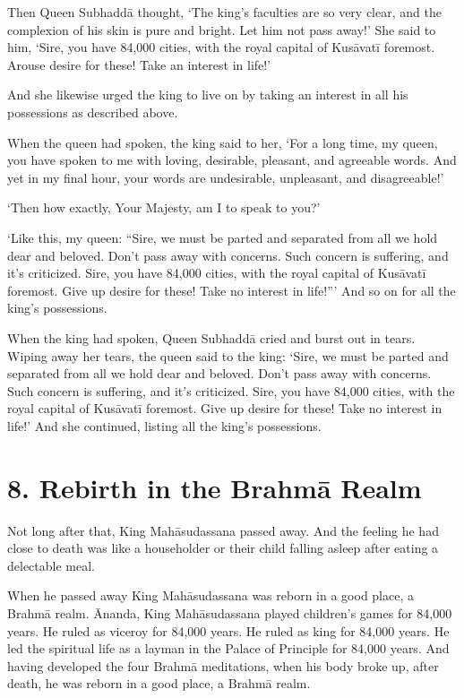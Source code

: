 \documentclass[12pt,openany]{book}%
\begin{document}
Then Queen \textsanskrit{Subhaddā} thought, ‘The king’s faculties are so very clear, and the complexion of his skin is pure and bright. Let him not pass away!’ She said to him, ‘Sire, you have 84,000 cities, with the royal capital of \textsanskrit{Kusāvatī} foremost. Arouse desire for these! Take an interest in life!’ 

And she likewise urged the king to live on by taking an interest in all his possessions as described above. 

When the queen had spoken, the king said to her, ‘For a long time, my queen, you have spoken to me with loving, desirable, pleasant, and agreeable words. And yet in my final hour, your words are undesirable, unpleasant, and disagreeable!’ 

‘Then how exactly, Your Majesty, am I to speak to you?’ 

‘Like this, my queen: “Sire, we must be parted and separated from all we hold dear and beloved. Don’t pass away with concerns. Such concern is suffering, and it’s criticized. Sire, you have 84,000 cities, with the royal capital of \textsanskrit{Kusāvatī} foremost. Give up desire for these! Take no interest in life!”’ And so on for all the king’s possessions. 

When the king had spoken, Queen \textsanskrit{Subhaddā} cried and burst out in tears. Wiping away her tears, the queen said to the king: ‘Sire, we must be parted and separated from all we hold dear and beloved. Don’t pass away with concerns. Such concern is suffering, and it’s criticized. Sire, you have 84,000 cities, with the royal capital of \textsanskrit{Kusāvatī} foremost. Give up desire for these! Take no interest in life!’ And she continued, listing all the king’s possessions. 

\section*{8. Rebirth in the \textsanskrit{Brahmā} Realm }

Not long after that, King \textsanskrit{Mahāsudassana} passed away. And the feeling he had close to death was like a householder or their child falling asleep after eating a delectable meal. 

When he passed away King \textsanskrit{Mahāsudassana} was reborn in a good place, a \textsanskrit{Brahmā} realm. Ānanda, King \textsanskrit{Mahāsudassana} played children’s games for 84,000 years. He ruled as viceroy for 84,000 years. He ruled as king for 84,000 years. He led the spiritual life as a layman in the Palace of Principle for 84,000 years. And having developed the four \textsanskrit{Brahmā} meditations, when his body broke up, after death, he was reborn in a good place, a \textsanskrit{Brahmā} realm. 
\end{document}
